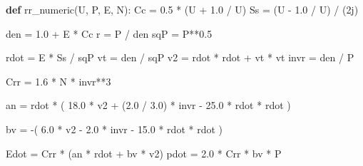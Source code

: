\documentclass[
  a4paper,
]{article}
\newenvironment{Shaded}{}{}
\newcommand{\DecValTok}[1]{\textcolor[rgb]{0.25,0.63,0.44}{#1}}
\newcommand{\FloatTok}[1]{\textcolor[rgb]{0.25,0.63,0.44}{#1}}
\newcommand{\KeywordTok}[1]{\textcolor[rgb]{0.00,0.44,0.13}{\textbf{#1}}}
\newcommand{\NormalTok}[1]{#1}
\newcommand{\OperatorTok}[1]{\textcolor[rgb]{0.40,0.40,0.40}{#1}}
\newcommand{\OtherTok}[1]{\textcolor[rgb]{0.00,0.44,0.13}{#1}}
\begin{document}
\begin{Shaded}
\begin{Highlighting}[]
\KeywordTok{def}\NormalTok{ rr\_numeric(U, P, E, N):}
\NormalTok{    Cc }\OperatorTok{=} \FloatTok{0.5} \OperatorTok{*}\NormalTok{ (U }\OperatorTok{+} \FloatTok{1.0} \OperatorTok{/}\NormalTok{ U)}
\NormalTok{    Ss }\OperatorTok{=}\NormalTok{ (U }\OperatorTok{{-}} \FloatTok{1.0} \OperatorTok{/}\NormalTok{ U) }\OperatorTok{/}\NormalTok{ (}\OtherTok{2j}\NormalTok{)}

\NormalTok{    den }\OperatorTok{=} \FloatTok{1.0} \OperatorTok{+}\NormalTok{ E }\OperatorTok{*}\NormalTok{ Cc}
\NormalTok{    r }\OperatorTok{=}\NormalTok{ P }\OperatorTok{/}\NormalTok{ den}
\NormalTok{    sqP }\OperatorTok{=}\NormalTok{ P}\OperatorTok{**}\FloatTok{0.5}

\NormalTok{    rdot }\OperatorTok{=}\NormalTok{ E }\OperatorTok{*}\NormalTok{ Ss }\OperatorTok{/}\NormalTok{ sqP}
\NormalTok{    vt }\OperatorTok{=}\NormalTok{ den }\OperatorTok{/}\NormalTok{ sqP}
\NormalTok{    v2 }\OperatorTok{=}\NormalTok{ rdot }\OperatorTok{*}\NormalTok{ rdot }\OperatorTok{+}\NormalTok{ vt }\OperatorTok{*}\NormalTok{ vt}
\NormalTok{    invr }\OperatorTok{=}\NormalTok{ den }\OperatorTok{/}\NormalTok{ P}

\NormalTok{    Crr }\OperatorTok{=} \FloatTok{1.6} \OperatorTok{*}\NormalTok{ N }\OperatorTok{*}\NormalTok{ invr}\OperatorTok{**}\DecValTok{3}

\NormalTok{    an }\OperatorTok{=}\NormalTok{ rdot }\OperatorTok{*}\NormalTok{ (}
        \FloatTok{18.0} \OperatorTok{*}\NormalTok{ v2}
        \OperatorTok{+}\NormalTok{ (}\FloatTok{2.0} \OperatorTok{/} \FloatTok{3.0}\NormalTok{) }\OperatorTok{*}\NormalTok{ invr}
        \OperatorTok{{-}} \FloatTok{25.0} \OperatorTok{*}\NormalTok{ rdot }\OperatorTok{*}\NormalTok{ rdot}
\NormalTok{    )}

\NormalTok{    bv }\OperatorTok{=} \OperatorTok{{-}}\NormalTok{(}
        \FloatTok{6.0} \OperatorTok{*}\NormalTok{ v2}
        \OperatorTok{{-}} \FloatTok{2.0} \OperatorTok{*}\NormalTok{ invr}
        \OperatorTok{{-}} \FloatTok{15.0} \OperatorTok{*}\NormalTok{ rdot }\OperatorTok{*}\NormalTok{ rdot}
\NormalTok{    )}

\NormalTok{    Edot }\OperatorTok{=}\NormalTok{ Crr }\OperatorTok{*}\NormalTok{ (an }\OperatorTok{*}\NormalTok{ rdot }\OperatorTok{+}\NormalTok{ bv }\OperatorTok{*}\NormalTok{ v2)}
\NormalTok{    pdot }\OperatorTok{=} \FloatTok{2.0} \OperatorTok{*}\NormalTok{ Crr }\OperatorTok{*}\NormalTok{ bv }\OperatorTok{*}\NormalTok{ P}


\end{Highlighting}
\end{Shaded}
\end{document}
